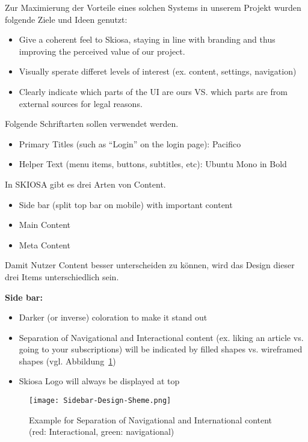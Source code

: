 Zur Maximierung der Vorteile eines solchen Systems in unserem Projekt wurden folgende Ziele und Ideen genutzt:
\begin{itemize}
    \item Give a coherent feel to Skiosa, staying in line with branding and thus improving the perceived value of our project.
    \item Visually sperate differet levels of interest (ex. content, settings, navigation)
    \item Clearly indicate which parts of the UI are ours VS. which parts are from external sources for legal reasons.
\end{itemize}

Folgende Schriftarten sollen verwendet werden. 

\begin{itemize}
    \item Primary Titles (such as “Login” on the login page): Pacifico
    \item Helper Text (menu items, buttons, subtitles, etc): Ubuntu Mono in Bold
\end{itemize}


In SKIOSA gibt es drei Arten von Content.  
\begin{itemize}
    \item Side bar (split top bar on mobile) with important content
    \item Main Content
    \item Meta Content
\end{itemize}

Damit Nutzer Content besser unterscheiden zu können, wird das Design dieser drei Items unterschiedlich sein.

\textbf{Side bar:}
\begin{itemize}
    \item Darker (or inverse) coloration to make it stand out
    \item Separation of Navigational and Interactional content (ex. liking an article vs. going to your subscriptions) will be indicated by filled shapes vs. wireframed shapes (vgl. Abbildung~\ref{fig:Sidebar-Design-Shema})
    \item Skiosa Logo will always be displayed at top
\end{itemize}

\begin{figure}
    \texttt{[image: Sidebar-Design-Sheme.png]}
    \caption{Example for Separation of Navigational and International content (red: Interactional, green: navigational)}
    \label{fig:Sidebar-Design-Shema}
\end{figure}

